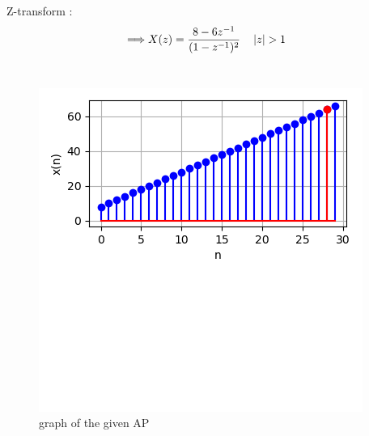 \documentclass[journal,12pt,twocolumn]{IEEEtran}
\begin{document}
 Z-transform :
\begin{align}
\implies &X(z)=\frac{8-6z^{-1}}{(1-z^{-1})^2} \quad \left\vert z\right\vert>1
\end{align}\\[130pt]
\begin{figure}[h!]
    \centering
    \includegraphics[width=\columnwidth]{figs/plot.png}
    \caption{graph of the given AP}
    \label{fig:1}
\end{figure}
\end{document}
